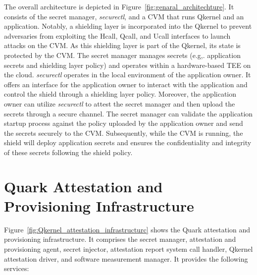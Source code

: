 The overall architecture is depicted in Figure~\ref{fig:genaral_architechture}. It consists of the secret manager, \emph{securectl}, and a \acrshort{CVM} that runs Qkernel and an application. Notably, a shielding layer is incorporated into the Qkernel to prevent adversaries from exploiting the Hcall, Qcall, and Ucall interfaces to launch attacks on the 
\acrshort{CVM}. As this shielding layer is part of the Qkernel, its state is protected by the \acrshort{CVM}. The secret manager manages secrets (e.g,. application secrets and shielding layer policy) and operates within a hardware-based TEE on the cloud. \emph{securectl} operates in the local environment of the application owner. It offers an interface for the application owner 
to interact with the application and control the shield through a shielding layer policy. Moreover, the application owner can utilize \emph{securectl} to attest the secret manager and then upload the secrets through a secure channel. The secret manager can validate the application startup process against the policy uploaded by the application owner and send the secrets securely to the \acrshort{CVM}. 
Subsequently, while the \acrshort{CVM} is running, the shield will deploy application secrets and ensures the confidentiality and integrity of these secrets following the shield policy.


\section{Quark Attestation and Provisioning Infrastructure}



Figure~\ref{fig:Qkernel_attestation_infrastructurc} shows the Quark attestation and provisioning infrastructure. It comprises the secret manager, attestation and provisioning agent, secret injector, attestation report system call handler, Qkernel attestation driver, and software measurement manager. It provides the following services:

\label{sec:design_Quark_Attestation_and_Provisioning_Infrastructure}

